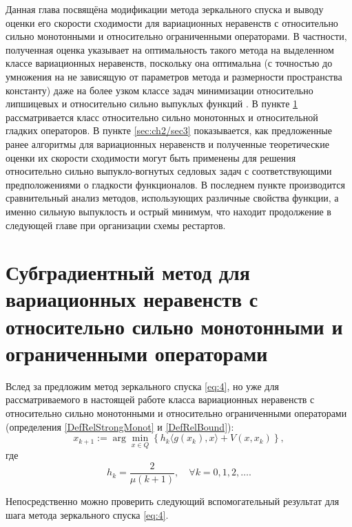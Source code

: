     Данная глава посвящёна модификации метода зеркального спуска и выводу оценки его скорости сходимости для вариационных неравенств с относительно сильно монотонными и относительно ограниченными операторами. В частности, полученная оценка указывает на оптимальность такого метода на выделенном классе вариационных неравенств, поскольку она оптимальна (с точностью до умножения на не зависящую от параметров метода и размерности пространства константу) даже на более узком классе задач минимизации относительно липшицевых и относительно сильно выпуклых функций \cite{Lu_2018}. В пункте \ref{sec:ch2/sec2} рассматривается класс относительно сильно монотонных и относительной гладких операторов. В пункте \ref{sec:ch2/sec3} показывается, как предложенные ранее алгоритмы для вариационных неравенств и полученные теоретические оценки их скорости сходимости могут быть применены для решения относительно сильно выпукло-вогнутых седловых задач с соответствующими предположениями о гладкости функционалов. В последнем пункте производится сравнительный анализ методов, использующих различные свойства функции, а именно сильную выпуклость и острый минимум, что находит продолжение в следующей главе при организации схемы рестартов. 

\section{Субградиентный метод для вариационных неравенств с относительно сильно монотонными и ограниченными операторами}\label{sec:ch2/sec2}

    Вслед за \cite{Bach_2012} предложим метод зеркального спуска \eqref{eq:4}, но уже для рассматриваемого в настоящей работе класса  вариационных неравенств с относительно сильно монотонными и относительно ограниченными операторами (определения \ref{DefRelStrongMonot} и \ref{DefRelBound}):
    \begin{equation} \label{eq:4}
        x_{k+1} := \arg \min_{x \in Q} \left\{ h_k \langle g(x_k), x \rangle + V(x, x_k)\right\},
    \end{equation}
    где
    $$
        h_k = \frac{2}{\mu(k+1)},\quad  \forall k= 0,1, 2, \ldots.
    $$

    Непосредственно можно проверить следующий вспомогательный результат для шага метода зеркального спуска \eqref{eq:4}.

